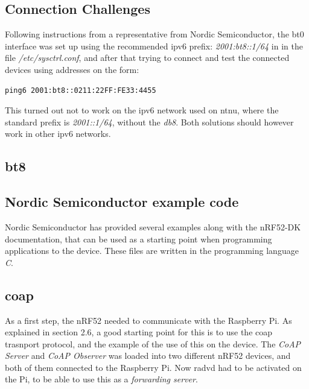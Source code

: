 \subsection{Connection Challenges}

Following instructions from a representative from Nordic Semiconductor, the bt0 interface was set up using the recommended \gls{ipv6} prefix: \textit{2001:bt8::1/64} in in the file \textit{/etc/sysctrl.conf}, and after that trying to connect and test the connected devices using addresses on the form: 

\begin{verbatim}
ping6 2001:bt8::0211:22FF:FE33:4455
\end{verbatim}

This turned out not to work on the \gls{ipv6} network used on \gls{ntnu}, where the standard prefix is \textit{2001::1/64}, without the \textit{db8}. Both solutions should however work in other \gls{ipv6} networks. 

\subsection{bt8}





\subsection{Nordic Semiconductor example code}

Nordic Semiconductor has provided several examples along with the nRF52-DK documentation, that can be used as a starting point when programming applications to the device. These files are written in the programming language \textit{C}. 

\subsection{\gls{coap}}

As a first step, the nRF52 needed to communicate with the Raspberry Pi. As explained in section 2.6, a good starting point for this is to use the \gls{coap} trasnport protocol, and the example of the use of this on the device. The \textit{CoAP Server} and \textit{CoAP Observer} was loaded into two different nRF52 devices, and both of them connected to the Raspberry Pi. Now \gls{radvd} had to be activated on the Pi, to be able to use this as a \textit{forwarding server}. 

